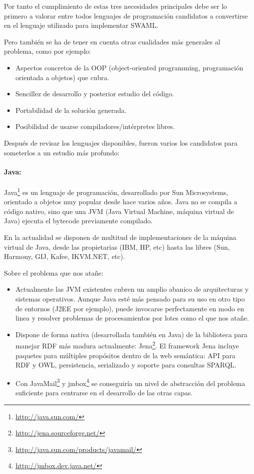 Por tanto el cumplimiento de estas tres necesidades principales debe ser lo 
primero a valorar entre todos lenguajes de programación candidatos a convertirse 
en el lenguaje utilizado para implementar SWAML. 

Pero también se ha de tener en cuenta otras cualidades más generales al problema,
como por ejemplo:

\begin{itemize}
  \item Aspectos concretos de la OOP (object-oriented programming, programación 
	orientada a objetos) que cubra.
  \item Sencillez de desarrollo y posterior estudio del código.
  \item Portabilidad de la solución generada.
  \item Posibilidad de usarse compiladores/intérpretes libres.
\end{itemize}

Después de revisar los lenguajes disponibles, fueron varios los candidatos para
someterlos a un estudio más profundo:

\paragraph{Java:}Java\footnote{\url{http://java.sun.com/}} es un lenguaje de 
programación, desarrollado por Sun Microsystems, orientado a objetos muy popular 
desde hace varios años. Java no se compila a código nativo, sino que una JVM 
(Java Virtual Machine, máquina virtual de Java) ejecuta el bytecode previamente 
compilado.

En la actualidad se disponen de multitud de implementaciones de la máquina virtual
de Java, desde las propietarias (IBM, HP, etc) hasta las libres (Sun, Harmony, GIJ, 
Kafee, IKVM.NET, etc).

Sobre el problema que nos atañe:

\begin{itemize}
  \item Actualmente las JVM existentes cubren un amplio abanico de arquitecturas y 
	sistemas operativos. Aunque Java esté más pensado para su uso en otro tipo
	de entornos (J2EE por ejemplo), puede invocarse perfectamente en modo en
	linea y resolver problemas de procesamientos por lotes como el que nos
	atañe.
  \item Dispone de forma nativa (desarrollada también en Java) de la biblioteca para
	manejar RDF más madura actualmente: Jena\footnote{\url{http://jena.sourceforge.net/}}.
	El framework Jena incluye paquetes para múltiples propósitos dentro de la web
	semántica: API para RDF y OWL, persistencia, serializado y soporte para consultas
	SPARQL.
  \item Con JavaMail\footnote{\url{http://java.sun.com/products/javamail/}} y
	jmbox\footnote{\url{http://jmbox.dev.java.net/}} se conseguiría un nivel
	de abstracción del problema suficiente para centrarse en el desarrollo
	de las otras capas.
\end{itemize}

